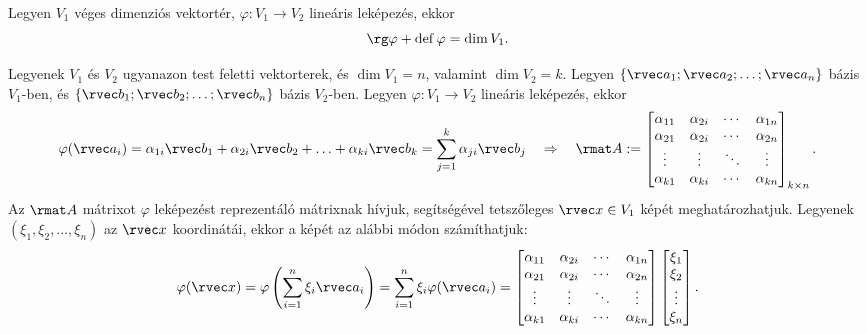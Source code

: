 \documentclass[a4paper, 12pt]{scrartcl}
\begin{document}
\begin{theorem}
  Legyen $V_1$ véges dimenziós vektortér, $\varphi: V_1 \rightarrow V_2$
  lineáris leképezés, ekkor
  $$
    \rg \varphi + \operatorname{def} \varphi = \dim V_1
    \text.
  $$
\end{theorem}

\begin{blueBox}

  Legyenek $V_1$ és $V_2$ ugyanazon test feletti vektorterek, és $\dim V_1 = n$,
  valamint $\dim V_2 = k$. Legyen $\{ \rvec a_1; \rvec a_2; \ldots; \rvec a_n \}$
  bázis $V_1$-ben, és $\{ \rvec b_1; \rvec b_2; \ldots; \rvec b_n \}$ bázis
  $V_2$-ben. Legyen $\varphi: V_1 \rightarrow V_2$ lineáris leképezés, ekkor
  $$
    \varphi(\rvec a_i)
    = \alpha_{1i} \rvec b_1
    + \alpha_{2i} \rvec b_2
    + \ldots
    + \alpha_{ki} \rvec b_k
    = \sum_{j=1}^{k} \alpha_{ji} \rvec b_j
    \quad\Rightarrow\quad
    \rmat A := \begin{bmatrix}
      \alpha_{11} & \alpha_{2i} & \cdots & \alpha_{1n} \\
      \alpha_{21} & \alpha_{2i} & \cdots & \alpha_{2n} \\
      \vdots      & \vdots      & \ddots & \vdots      \\
      \alpha_{k1} & \alpha_{ki} & \cdots & \alpha_{kn}
    \end{bmatrix}_{k \times n}
    \text.
  $$
  Az $\rmat A$ mátrixot $\varphi$ leképezést reprezentáló mátrixnak hívjuk,
  segítségével tetszőleges $\rvec x \in V_1$ képét meghatározhatjuk. Legyenek
  $(\xi_1, \xi_2, \ldots, \xi_n)$ az $\rvec x$ koordinátái, ekkor a képét az
  alábbi módon számíthatjuk:
  $$
    \varphi(\rvec x)
    = \varphi\left( \sum_{i=1}^{n} \xi_i \rvec a_i \right)
    = \sum_{i=1}^{n} \xi_i \varphi(\rvec a_i)
    = \begin{bmatrix}
      \alpha_{11} & \alpha_{2i} & \cdots & \alpha_{1n} \\
      \alpha_{21} & \alpha_{2i} & \cdots & \alpha_{2n} \\
      \vdots      & \vdots      & \ddots & \vdots      \\
      \alpha_{k1} & \alpha_{ki} & \cdots & \alpha_{kn}
    \end{bmatrix} \begin{bmatrix}
      \xi_1  \\
      \xi_2  \\
      \vdots \\
      \xi_n
    \end{bmatrix}
    \text.
  $$
\end{blueBox}
\end{document}
